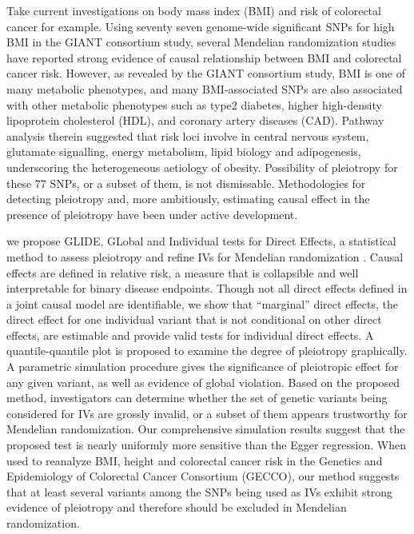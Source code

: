 \documentclass[12pt]{article}
\newcommand{\Rpackage}[1]{\textsf{#1}}
\begin{document}
Take current investigations on body mass index (BMI) and risk of colorectal cancer for example. Using seventy seven genome-wide significant SNPs for high BMI in the GIANT consortium study, several Mendelian randomization studies have reported strong evidence of causal relationship between BMI and colorectal cancer risk. However, as revealed by the GIANT consortium study, BMI is one of many metabolic phenotypes, and many BMI-associated SNPs are also associated with other metabolic phenotypes such as type2 diabetes, higher high-density lipoprotein cholesterol (HDL), and coronary artery diseases (CAD). Pathway analysis therein suggested that risk loci involve in central nervous system, glutamate signalling, energy metabolism, lipid biology and adipogenesis, underscoring the heterogeneous aetiology of obesity. Possibility of pleiotropy for these 77 SNPs, or a subset of them, is not dismissable. Methodologies for detecting pleiotropy and, more ambitiously, estimating causal effect in the presence of pleiotropy have been under active development. 

we propose \Rpackage{GLIDE}, GLobal and Individual tests for Direct Effects, a statistical method to assess pleiotropy and refine IVs for Mendelian randomization \cite{Dai2017}. Causal effects are defined in relative risk, a measure that is collapsible and well interpretable for binary disease endpoints. Though not all direct effects defined in a joint causal model are identifiable, we show that ``marginal'' direct effects, the direct effect for one individual variant that is not conditional on other direct effects, are estimable and provide valid tests for individual direct effects. A quantile-quantile plot is proposed to examine the degree of pleiotropy graphically. A parametric simulation procedure gives the significance of pleiotropic effect for any given variant, as well as evidence of global violation. Based on the proposed method, investigators can determine whether the set of genetic variants being considered for IVs are grossly invalid, or a subset of them appears trustworthy for Mendelian randomization. Our comprehensive simulation results suggest that the proposed test is nearly uniformly more sensitive than the Egger regression. When used to reanalyze BMI, height and colorectal cancer risk in the Genetics and Epidemiology of Colorectal Cancer Consortium (GECCO), our method suggests that at least several variants among the SNPs being used as IVs exhibit strong evidence of pleiotropy and therefore should be excluded in Mendelian randomization.
\end{document}
